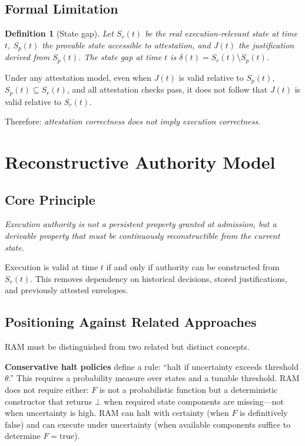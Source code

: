 \documentclass[11pt]{article}
\newtheorem{definition}{Definition}[section]
\newcommand{\Sr}{S_r}
\newcommand{\Sp}{S_p}
\newcommand{\Ndefval}{\bot}
\begin{document}
\subsection{Formal Limitation}
\label{subsec:formal-limit}

\begin{definition}[State gap]
Let $\Sr(t)$ be the real execution-relevant state at time $t$,
$\Sp(t)$ the provable state accessible to attestation, and
$J(t)$ the justification derived from $\Sp(t)$.
The \emph{state gap} at time $t$ is
$\delta(t) = \Sr(t) \setminus \Sp(t)$.
\end{definition}

Under any attestation model, even when $J(t)$ is valid relative to $\Sp(t)$,
$\Sp(t) \subseteq \Sr(t)$, and all attestation checks pass, it does not follow
that $J(t)$ is valid relative to $\Sr(t)$.

Therefore: \emph{attestation correctness does not imply execution correctness}.

\section{Reconstructive Authority Model}
\label{sec:ram}

\subsection{Core Principle}

\begin{center}
\textit{Execution authority is not a persistent property granted at admission,
but a derivable property that must be continuously reconstructible from the
current state.}
\end{center}

Execution is valid at time $t$ if and only if authority can be constructed
from $\Sr(t)$.
This removes dependency on historical decisions, stored justifications, and
previously attested envelopes.

\subsection{Positioning Against Related Approaches}
\label{subsec:positioning}

RAM must be distinguished from two related but distinct concepts.

\textbf{Conservative halt policies} define a rule: ``halt if uncertainty
exceeds threshold $\theta$.''
This requires a probability measure over states and a tunable threshold.
RAM does not require either: $F$ is not a probabilistic function but a
deterministic constructor that returns $\Ndefval$ when required state
components are missing---not when uncertainty is high.
RAM can halt with certainty (when $F$ is definitively $\text{false}$) and can
execute under uncertainty (when available components suffice to determine
$F = \text{true}$).
\end{document}
